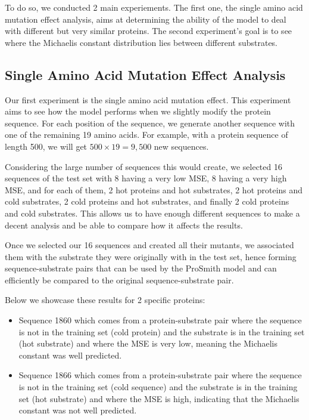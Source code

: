 To do so, we conducted 2 main experiements. The first one, the single amino acid mutation effect analysis,
aims at determining the ability of the model to deal with different but very similar proteins. 
The second experiment's goal is to see where the Michaelis constant distribution lies between different 
substrates.

\subsection{Single Amino Acid Mutation Effect Analysis}

Our first experiment is the single amino acid mutation effect. This experiment aims to see how the model
performs when we slightly modify the protein sequence. For each position of the sequence, we generate another
sequence with one of the remaining 19 amino acids. For example, with a protein sequence of length 500, we
will get $500\times19=9,500$ new sequences.

Considering the large number of sequences this would create, we selected 16 sequences of the test set with
8 having a very low MSE, 8 having a very high MSE, and for each of them, 2 hot proteins and hot substrates, 
2 hot proteins and cold substrates, 2 cold proteins and hot substrates, and finally 2 cold proteins and
cold substrates. This allows us to have enough different sequences to make a decent analysis and be
able to compare how it affects the results. 

Once we selected our 16 sequences and created all their mutants, we associated them with the substrate they
were originally with in the test set, hence forming sequence-substrate pairs that can be used by the ProSmith
model and can efficiently be compared to the original sequence-substrate pair.

Below we showcase these results for 2 specific proteins: 
\begin{itemize}
    \item Sequence 1860 which comes from a protein-substrate
    pair where the sequence is not in the training set (cold protein) and the substrate is in the training set 
    (hot substrate) and where the MSE is very low, meaning the Michaelis constant was well predicted.
    \item Sequence 1866 which comes from a protein-substrate pair where the sequence is not in the training set
    (cold sequence) and the substrate is in the training set (hot substrate) and where the MSE is high,
    indicating that the Michaelis constant was not well predicted.
\end{itemize}

